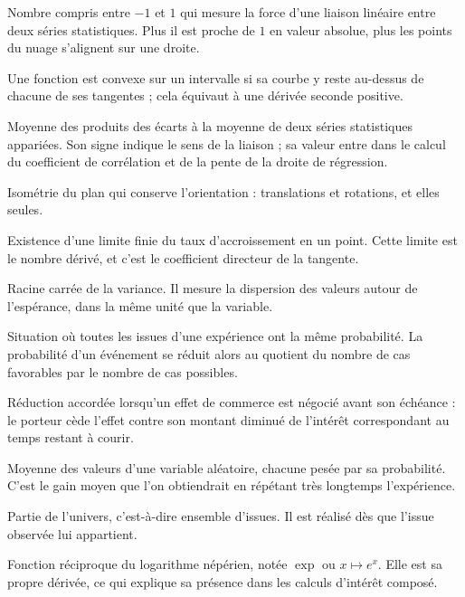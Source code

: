 Nombre compris entre $-1$ et $1$ qui mesure la force d'une liaison linéaire
entre deux séries statistiques. Plus il est proche de $1$ en valeur absolue,
plus les points du nuage s'alignent sur une droite.

Une fonction est convexe sur un intervalle si sa courbe y reste au-dessus de
chacune de ses tangentes ; cela équivaut à une dérivée seconde positive.

Moyenne des produits des écarts à la moyenne de deux séries statistiques
appariées. Son signe indique le sens de la liaison ; sa valeur entre dans le
calcul du coefficient de corrélation et de la pente de la droite de
régression.


Isométrie du plan qui conserve l'orientation : translations et rotations, et
elles seules.

Existence d'une limite finie du taux d'accroissement en un point. Cette limite
est le nombre dérivé, et c'est le coefficient directeur de la tangente.


Racine carrée de la variance. Il mesure la dispersion des valeurs autour de
l'espérance, dans la même unité que la variable.

Situation où toutes les issues d'une expérience ont la même probabilité. La
probabilité d'un événement se réduit alors au quotient du nombre de cas
favorables par le nombre de cas possibles.

Réduction accordée lorsqu'un effet de commerce est négocié avant son
échéance : le porteur cède l'effet contre son montant diminué de l'intérêt
correspondant au temps restant à courir.

Moyenne des valeurs d'une variable aléatoire, chacune pesée par sa
probabilité. C'est le gain moyen que l'on obtiendrait en répétant très
longtemps l'expérience.

Partie de l'univers, c'est-à-dire ensemble d'issues. Il est réalisé dès que
l'issue observée lui appartient.

Fonction réciproque du logarithme népérien, notée $\exp$ ou $x \mapsto e^{x}$.
Elle est sa propre dérivée, ce qui explique sa présence dans les calculs
d'intérêt composé.

